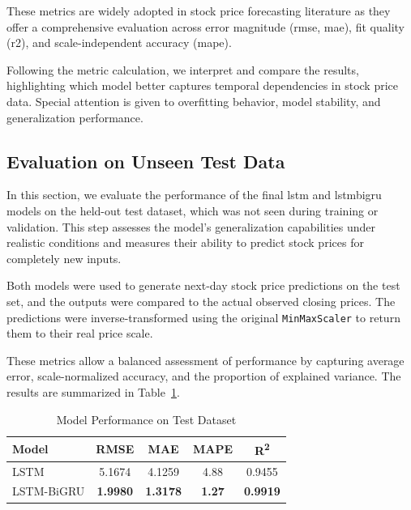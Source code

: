 These metrics are widely adopted in stock price forecasting literature
\parencite{parmar2018stock, nabipour2020DeepLearning, agrawal2022StockPrediction, chang2024StockPrediction}
as they offer a comprehensive evaluation across error magnitude (\acrshort{rmse}, \acrshort{mae}), fit quality (\acrshort{r2}), and scale-independent accuracy (\acrshort{mape}).

Following the metric calculation, we interpret and compare the results, highlighting which 
model better captures temporal dependencies in stock price data. Special attention is 
given to overfitting behavior, model stability, and generalization performance. 

\subsection{Evaluation on Unseen Test Data}

In this section, we evaluate the performance of the final \acrshort{lstm} and \acrshort{lstmbigru} models
on the held-out test dataset, which was not seen during training or validation. This step assesses the 
model's generalization capabilities under realistic conditions and measures their ability to predict 
stock prices for completely new inputs.

Both models were used to generate next-day stock price predictions on the test set, and the outputs
were compared to the actual observed closing prices. The predictions were inverse-transformed using 
the original \texttt{MinMaxScaler} to return them to their real price scale.

These metrics allow a balanced assessment of performance by capturing average error, scale-normalized accuracy, and the proportion of explained variance. The results are summarized in Table~\ref{tab:test-metrics-comparison}.

\begin{table}[H]
\centering
\caption{Model Performance on Test Dataset}
\label{tab:test-metrics-comparison}
\begin{tabular}{lcccc}
\hline
\textbf{Model} & \textbf{RMSE} & \textbf{MAE} & \textbf{MAPE} & \textbf{R\textsuperscript{2}} \\
\hline\hline
LSTM & 5.1674 & 4.1259 & 4.88 & 0.9455 \\
LSTM-BiGRU & \textbf{1.9980} & \textbf{1.3178} & \textbf{1.27} & \textbf{0.9919} \\
\hline
\end{tabular}
\end{table}

